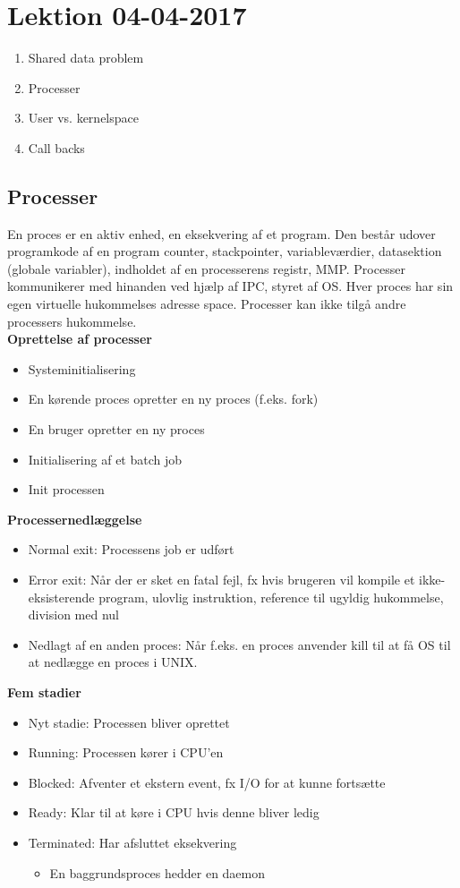 \section{Lektion 04-04-2017}

\begin{enumerate}
	\item Shared data problem
	\item Processer
	\item User vs. kernelspace
	\item Call backs
\end{enumerate}

\subsection{Processer}
En proces er en aktiv enhed, en eksekvering af et program. Den består udover programkode af en program counter, stackpointer, variableværdier, datasektion (globale variabler), indholdet af en processerens registr, MMP.
Processer kommunikerer med hinanden ved hjælp af IPC, styret af OS. Hver proces har sin egen virtuelle hukommelses adresse space. Processer kan ikke tilgå andre processers hukommelse. \\

\textbf{Oprettelse af processer}
\begin{itemize}
	\item Systeminitialisering
	\item En kørende proces opretter en ny proces (f.eks. fork)
	\item En bruger opretter en ny proces
	\item Initialisering af et batch job
	\item Init processen
\end{itemize}

\textbf{Processernedlæggelse}
\begin{itemize}
	\item Normal exit: Processens job er udført
	\item Error exit: Når der er sket en fatal fejl, fx hvis brugeren vil kompile et ikke-eksisterende program, ulovlig instruktion, reference til ugyldig hukommelse, division med nul
	\item Nedlagt af en anden proces: Når f.eks. en proces anvender kill til at få OS til at nedlægge en proces i UNIX.
\end{itemize}

\textbf{Fem stadier}
\begin{itemize}
	\item Nyt stadie: Processen bliver oprettet
	\item Running: Processen kører i CPU'en
	\item Blocked: Afventer et ekstern event, fx I/O for at kunne fortsætte
	\item Ready: Klar til at køre i CPU hvis denne bliver ledig
	\item Terminated: Har afsluttet eksekvering
	\begin{itemize}
		\item En baggrundsproces hedder en daemon
	\end{itemize}
\end{itemize} 


